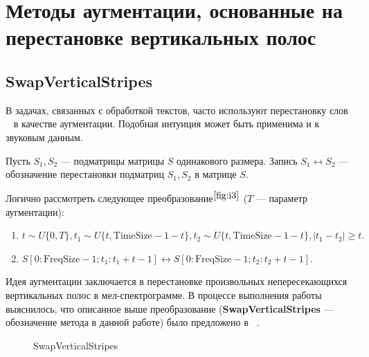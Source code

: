 \documentclass[12pt, fleqn]{article}
\begin{document}
\newpage

\section{Методы аугментации, основанные на перестановке вертикальных полос}

\subsection{SwapVerticalStripes}

В задачах, связанных с обработкой текстов, часто используют перестановку слов ~\cite{RandomSwap} в качестве аугментации. Подобная интуиция может быть применима и к звуковым данным. 

Пусть $S_1, S_2$ --- подматрицы матрицы $S$ одинакового размера. Запись \newline $S_1 \leftrightarrow S_2$ --- обозначение перестановки подматриц $S_1, S_2$ в матрице $S$.

Логично рассмотреть следующее преобразование$^{\ref{fig:i3}}$ ($T$ --- параметр аугментации): 
\begin{enumerate}
    \item $t \sim U\{0, T\}, t_1 \sim U\{t, \text{TimeSize} - 1 - t\}, t_2 \sim U\{t, \text{TimeSize} - 1 - t\}, |t_1 - t_2| \geq t.$
    \item $S[0:\text{FreqSize} - 1; t_1: t_1 + t - 1] \leftrightarrow S[0:\text{FreqSize} - 1; t_2 : t_2 + t - 1]$.
\end{enumerate}

Идея аугментации заключается в перестановке произвольных непересекающихся вертикальных полос в мел-спектрограмме. В процессе выполнения работы выяснилось, что описанное выше преобразование (\textbf{SwapVerticalStripes} --- обозначение метода в данной работе) было предложено в ~\cite{SpecSwap}. 

\begin{figure}[ht!]
	\caption{SwapVerticalStripes}
	\label{fig:i3}
\end{figure}
\end{document}

